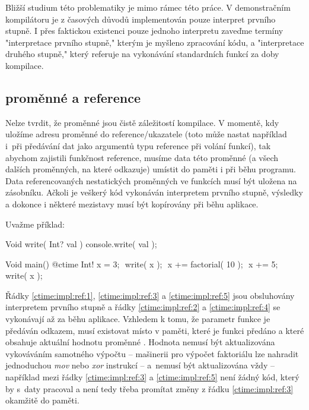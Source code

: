 Bližší studium této problematiky je mimo rámec této práce. V demonstračním kompilátoru je z časových důvodů implementován pouze interpret prvního stupně. I přes faktickou existenci pouze jednoho interpretu zaveďme termíny "interpretace prvního stupně," kterým je myšleno zpracování \ctime kódu, a "interpretace druhého stupně," který referuje na vykonávání standardních funkcí za doby kompilace.

\subsection{\ctime proměnné a \nonctime reference}
Nelze tvrdit, že \ctime proměnné jsou čistě záležitostí kompilace. V momentě, kdy uložíme adresu \ctime proměnné do \nonctime reference/ukazatele (toto může nastat například i~při předávání \ctime dat jako argumentů typu reference při volání \nonctime funkcí), tak abychom zajistili funkčnost reference, musíme data této proměnné (a všech dalších proměnných, na které odkazuje) umístit do paměti i při běhu programu. Data referencovaných nestatických \ctime proměnných ve funkcích musí být uložena na zásobníku. Ačkoli je veškerý \ctime kód vykonáván interpretem prvního stupně, výsledky a dokonce i některé mezistavy musí být kopírovány při běhu aplikace.

Uvažme příklad:

\begin{code}
Void write( Int? val ) {
	console.write( val );
}
	
Void main() {
	@ctime Int! x = 3; $\label{ctime:impl:ref:1}$
	write( x ); $\label{ctime:impl:ref:2}$
	x += factorial( 10 ); $\label{ctime:impl:ref:3}$
	x += 5; $\label{ctime:impl:ref:5}$
	write( x ); $\label{ctime:impl:ref:4}$
}
\end{code}

Řádky \ref{ctime:impl:ref:1}, \ref{ctime:impl:ref:3} a \ref{ctime:impl:ref:5} jsou obsluhovány interpretem prvního stupně a řádky \ref{ctime:impl:ref:2} a \ref{ctime:impl:ref:4} se vykonávají až za běhu aplikace. Vzhledem k tomu, že parametr funkce  je předáván odkazem, musí existovat místo v paměti, které je funkci předáno a které obsahuje aktuální hodnotu proměnné . Hodnota nemusí být aktualizována vykováváním samotného výpočtu -- mašinerii pro výpočet faktoriálu lze nahradit jednoduchou \textit{mov} nebo \textit{xor} instrukcí -- a~nemusí být aktualizována vždy -- například mezi řádky \ref{ctime:impl:ref:3} a \ref{ctime:impl:ref:5} není žádný \nonctime kód, který by s~daty pracoval a není tedy třeba promítat změny z řádku \ref{ctime:impl:ref:3} okamžitě do paměti. 

